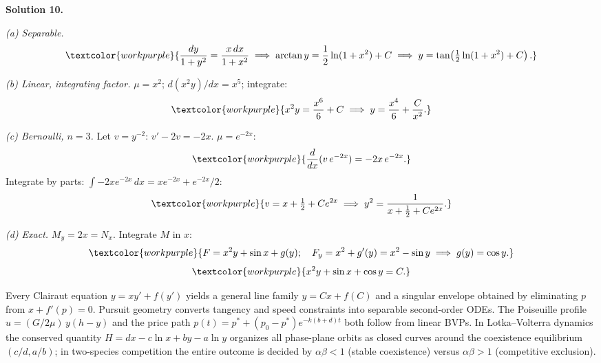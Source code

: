 \noindent\textbf{Solution 10.}\quad

\noindent\textit{(a) Separable.}
\[
  \textcolor{workpurple}{\frac{dy}{1+y^2} = \frac{x\,dx}{1+x^2}
  \;\Longrightarrow\;
  \arctan y = \frac{1}{2}\ln(1+x^2) + C
  \;\Longrightarrow\;
  y = \tan\!\left(\tfrac{1}{2}\ln(1+x^2)+C\right).}
\]

\noindent\textit{(b) Linear, integrating factor.}
$\mu = x^2$; $d(x^2 y)/dx = x^5$; integrate:
\[
  \textcolor{workpurple}{x^2 y = \frac{x^6}{6} + C
  \;\Longrightarrow\;
  y = \frac{x^4}{6} + \frac{C}{x^2}.}
\]

\noindent\textit{(c) Bernoulli, $n = 3$.}
Let $v = y^{-2}$: $v' - 2v = -2x$. $\mu = e^{-2x}$:
\[
  \textcolor{workpurple}{\frac{d}{dx}(v\,e^{-2x}) = -2x\,e^{-2x}.}
\]
Integrate by parts: $\int -2x e^{-2x}\,dx = xe^{-2x} + e^{-2x}/2$:
\[
  \textcolor{workpurple}{v = x + \tfrac{1}{2} + Ce^{2x}
  \;\Longrightarrow\;
  y^2 = \frac{1}{x + \tfrac{1}{2} + Ce^{2x}}.}
\]

\noindent\textit{(d) Exact.}
$M_y = 2x = N_x$. Integrate $M$ in $x$:
\[
  \textcolor{workpurple}{F = x^2 y + \sin x + g(y);\quad
  F_y = x^2 + g'(y) = x^2 - \sin y
  \;\Longrightarrow\; g(y) = \cos y.}
\]
\[
  \textcolor{workpurple}{x^2 y + \sin x + \cos y = C.}
\]

\vspace{0.8em}

\begin{conceptbox}
Every Clairaut equation $y = xy' + f(y')$ yields a
\textcolor{accentorange}{general line family $y = Cx + f(C)$} and a
\textcolor{accentorange}{singular envelope} obtained by eliminating $p$ from
$x + f'(p) = 0$. Pursuit geometry converts tangency and speed constraints
into separable second-order ODEs. The Poiseuille profile
\textcolor{accentorange}{$u = (G/2\mu)\,y(h-y)$} and the price path
\textcolor{accentorange}{$p(t) = p^* + (p_0 - p^*)e^{-k(b+d)t}$} both follow
from linear BVPs. In Lotka--Volterra dynamics the
\textcolor{accentorange}{conserved quantity $H = dx - c\ln x + by - a\ln y$}
organizes all phase-plane orbits as closed curves around the coexistence
equilibrium $(c/d, a/b)$; in two-species competition the entire outcome is
decided by \textcolor{accentorange}{$\alpha\beta < 1$ (stable coexistence) versus
$\alpha\beta > 1$ (competitive exclusion)}.
\end{conceptbox}


